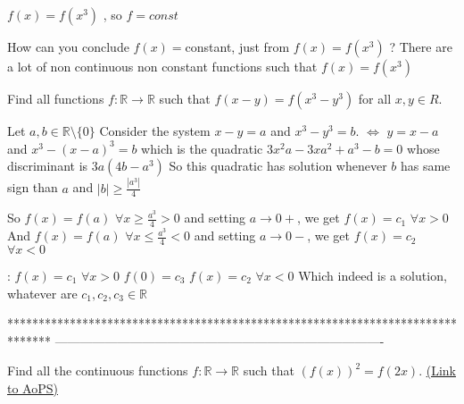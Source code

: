 \begin{solution}
	\begin{tcolorbox}$f(x)=f(x^3)$ , so $f=const$\end{tcolorbox}
How can you conclude $f(x)=$constant, just from $f(x)=f(x^3)$ ?
There are a lot of non continuous non constant functions such that $f(x)=f(x^3)$
\end{solution}



\begin{solution}
	\begin{tcolorbox}Find all functions $f: \mathbb{R}\to\mathbb{R}$ such that $f(x-y)=f(x^3-y^3)$ for all $x,y{\in}R$.\end{tcolorbox}
Let $a,b\in\mathbb R\setminus\{0\}$
Consider the system $x-y=a$ and $x^3-y^3=b$.
$\iff$ $y=x-a$ and $x^3-(x-a)^3=b$ which is the quadratic $3x^2a-3xa^2+a^3-b=0$ whose discriminant is $3a(4b-a^3)$
So this quadratic has solution whenever $b$ has same sign than $a$ and $|b|\ge \frac{|a^3|}4$

So $f(x)=f(a)$ $\forall x\ge \frac{a^3}4>0$ and setting $a\to 0+$, we get $f(x)=c_1$ $\forall x>0$
And $f(x)=f(a)$ $\forall x\le \frac{a^3}4<0$ and setting $a\to 0-$, we get $f(x)=c_2$ $\forall x<0$

:
$f(x)=c_1$ $\forall x>0$
$f(0)=c_3$
$f(x)=c_2$ $\forall x<0$
Which indeed is a solution, whatever are $c_1,c_2,c_3\in\mathbb R$
\end{solution}
*******************************************************************************
-------------------------------------------------------------------------------

\begin{problem}
	Find all the continuous functions $f: \mathbb{R}\to\mathbb{R}$ such that $(f(x))^2=f(2x)$.
	\flushright \href{https://artofproblemsolving.com/community/c6h565357}{(Link to AoPS)}
\end{problem}



